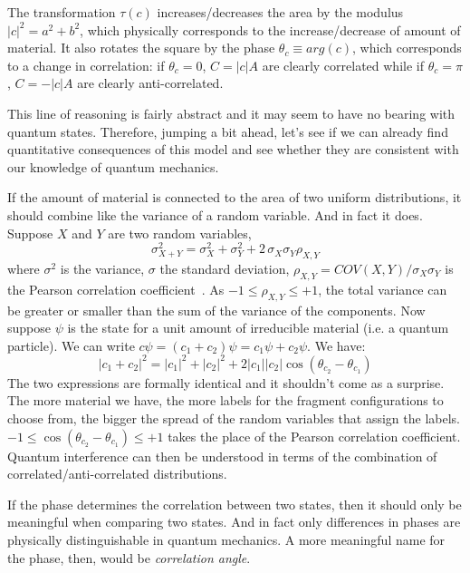 \documentclass[smallextended]{svjour3}
\numberwithin{equation}{section}
\theoremstyle{definition}
\begin{document}
The transformation $\tau(c)$ increases/decreases the area by the modulus $|c|^2=a^2+b^2$, which physically corresponds to the increase/decrease of amount of material. It also rotates the square by the phase $\theta_c \equiv arg(c)$, which corresponds to a change in correlation: if $\theta_c = 0$, $C = |c| A$ are clearly correlated while if $\theta_c = \pi$, $C = - |c| A$ are clearly anti-correlated.

This line of reasoning is fairly abstract and it may seem to have no bearing with quantum states. Therefore, jumping a bit ahead, let's see if we can already find quantitative consequences of this model and see whether they are consistent with our knowledge of quantum mechanics.

If the amount of material is connected to the area of two uniform distributions, it should combine like the variance of a random variable. And in fact it does. Suppose $X$ and $Y$ are two random variables,
\begin{equation}\label{eqn:correlation}
\sigma^2_{X+Y} = \sigma^2_{X} + \sigma^2_{Y} + 2 \, \sigma_{X} \sigma_{Y} \rho_{X,Y}
\end{equation}
where $\sigma^2$ is the variance, $\sigma$ the standard deviation, $\rho_{X,Y}= COV(X,Y)/\sigma_{X} \sigma_{Y}$ is the Pearson correlation coefficient~\cite{Grimmet}. As $-1\leq\rho_{X,Y}\leq+1$, the total variance can be greater or smaller than the sum of the variance of the components. Now suppose $\psi$ is the state for a unit amount of irreducible material (i.e. a quantum particle). We can write $c \psi = (c_1 + c_2) \psi = c_1 \psi + c_2 \psi$. We have:
\begin{equation}\label{eqn:correlation_state}
|c_1+c_2|^2=|c_1|^2 + |c_2|^2 + 2 |c_1||c_2|\cos(\theta_{c_2} - \theta_{c_1})
\end{equation}
The two expressions are formally identical and it shouldn't come as a surprise. The more material we have, the more labels for the fragment configurations to choose from, the bigger the spread of the random variables that assign the labels. $-1\leq\cos(\theta_{c_2} - \theta_{c_1})\leq+1$ takes the place of the Pearson correlation coefficient. Quantum interference can then be understood in terms of the combination of correlated/anti-correlated distributions.

If the phase determines the correlation between two states, then it should only be meaningful when comparing two states. And in fact only differences in phases are physically distinguishable in quantum mechanics. A more meaningful name for the phase, then, would be \emph{correlation angle}.
\end{document}
